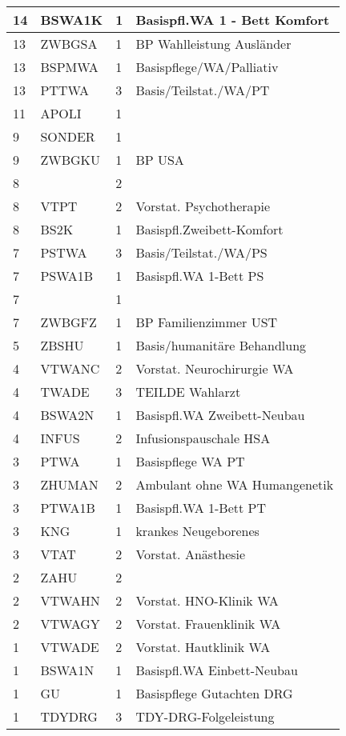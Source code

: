 \begin{center}
\begin{longtable}{|p{2.3cm}|p{2.3cm}|p{2.2cm}|p{6cm}|}
14 & BSWA1K & 1 & Basispfl.WA 1 - Bett Komfort \\ \hline
13 & ZWBGSA & 1 & BP Wahlleistung Ausländer \\ \hline
13 & BSPMWA & 1 & Basispflege/WA/Palliativ \\ \hline
13 & PTTWA & 3 & Basis/Teilstat./WA/PT \\ \hline
11 & APOLI & 1 &  \\ \hline
9 & SONDER & 1 &  \\ \hline
9 & ZWBGKU & 1 & BP USA \\ \hline
8 &  & 2 &  \\ \hline
8 & VTPT & 2 & Vorstat. Psychotherapie \\ \hline
8 & BS2K & 1 & Basispfl.Zweibett-Komfort \\ \hline
7 & PSTWA & 3 & Basis/Teilstat./WA/PS \\ \hline
7 & PSWA1B & 1 & Basispfl.WA 1-Bett PS \\ \hline
7 &  & 1 &  \\ \hline
7 & ZWBGFZ & 1 & BP Familienzimmer UST \\ \hline
5 & ZBSHU & 1 & Basis/humanitäre Behandlung \\ \hline
4 & VTWANC & 2 & Vorstat. Neurochirurgie  WA \\ \hline
4 & TWADE & 3 & TEILDE Wahlarzt \\ \hline
4 & BSWA2N & 1 & Basispfl.WA Zweibett-Neubau \\ \hline
4 & INFUS & 2 & Infusionspauschale HSA \\ \hline
3 & PTWA & 1 & Basispflege WA PT \\ \hline
3 & ZHUMAN & 2 & Ambulant ohne WA Humangenetik \\ \hline
3 & PTWA1B & 1 & Basispfl.WA 1-Bett PT \\ \hline
3 & KNG & 1 & krankes Neugeborenes \\ \hline
3 & VTAT & 2 & Vorstat. Anästhesie \\ \hline
2 & ZAHU & 2 &  \\ \hline
2 & VTWAHN & 2 & Vorstat. HNO-Klinik  WA \\ \hline
2 & VTWAGY & 2 & Vorstat. Frauenklinik  WA \\ \hline
1 & VTWADE & 2 & Vorstat. Hautklinik  WA \\ \hline
1 & BSWA1N & 1 & Basispfl.WA Einbett-Neubau \\ \hline
1 & GU & 1 & Basispflege Gutachten DRG \\ \hline
1 & TDYDRG & 3 & TDY-DRG-Folgeleistung \\ \hline

\end{longtable}
\end{center}
